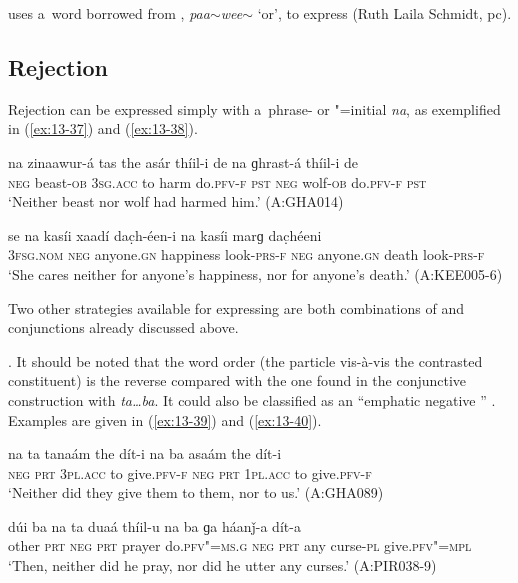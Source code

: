  uses a~word borrowed from , \textit{paa$\sim$wee$\sim$} `or', to express  (Ruth Laila Schmidt, pc).


\subsection{Rejection}
\label{subsec:13-2-4}

 Rejection can be expressed simply with a~phrase- or "=initial  \textit{na}, as exemplified in (\ref{ex:13-37}) and (\ref{ex:13-38}).

\begin{exe}
\ex
\label{ex:13-37}
\gll na zinaawur-á tas the asár thíil-i de na ɡhrast-á thíil-i de \\
\textsc{neg} beast-\textsc{ob} \textsc{3sg.acc} to harm do.\textsc{pfv-f} \textsc{pst}  \textsc{neg} wolf-\textsc{ob} do.\textsc{pfv-f} \textsc{pst} \\
\glt `Neither beast nor wolf had harmed him.' (A:GHA014)

\ex
\label{ex:13-38}
\gll se na kasíi xaadí dac̣h-éen-i na kasíi marɡ dac̣héeni \\
\textsc{3fsg.nom} \textsc{neg} anyone.\textsc{gn} happiness look-\textsc{prs-f}  \textsc{neg} anyone.\textsc{gn} death look-\textsc{prs-f}  \\
\glt `She cares neither for anyone's happiness, nor for anyone's death.' (A:KEE005-6) 
\end{exe}

Two other strategies available for expressing  are both combinations of  and conjunctions already discussed above.


. It should be noted that the word order (the particle vis-à-vis the contrasted constituent) is the reverse compared with the one found in the conjunctive construction with \textit{ta{\ldots}ba}. It could also be classified as an ``emphatic negative '' \citep[17--19]{haspelmath2007}. Examples are given in (\ref{ex:13-39}) and (\ref{ex:13-40}).

\begin{exe}
\ex
\label{ex:13-39}
\gll na ta tanaám the dít-i na ba asaám the dít-i \\
\textsc{neg} \textsc{prt} \textsc{3pl.acc} to give.\textsc{pfv-f} \textsc{neg} \textsc{prt} \textsc{1pl.acc} to give.\textsc{pfv-f}  \\
\glt `Neither did they give them to them, nor to us.' (A:GHA089)

\ex
\label{ex:13-40}
\gll dúi ba na ta duaá thíil-u na ba ɡa háanǰ-a dít-a \\
other \textsc{prt} \textsc{neg} \textsc{prt} prayer do.\textsc{pfv"=ms.g} \textsc{neg} \textsc{prt} any curse-\textsc{pl} give.\textsc{pfv"=mpl}\\
\glt `Then, neither did he pray, nor did he utter any curses.' (A:PIR038-9) 
\end{exe}

